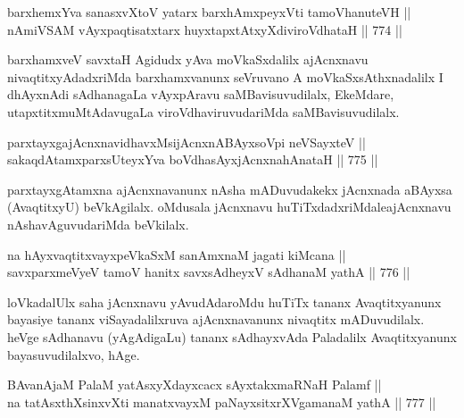 
\begin{shl}
barxhemxYva sanasxvXtoV yatarx barxhAmxpeyxVti tamoVhanuteVH || \\
nAmiVSAM vAyxpaqtisatxtarx huyxtapxtAtxyXdiviroVdhataH \hfill || 774 ||  
\end{shl}

\begin{artha} 
barxhamxveV savxtaH Agidudx yAva moVkaSxdalilx ajAcnxnavu nivaqtitxyAdadxriMda barxhamxvanunx seVruvano A moVkaSxsAthxnadalilx I dhAyxnAdi sAdhanagaLa vAyxpAravu saMBavisuvudilalx, EkeMdare, utapxtitx\break muMtAdavugaLa viroVdhaviruvudariMda saMBavisuvudilalx.
\end{artha}


\begin{shl}
parxtayxgajAcnxnavidhavxMsijAcnxnABAyxsoV\s pi neVSayxteV || \\
sakaqdAtamxparxsUteyxYva boVdhasAyxjAcnxnahAnataH \hfill || 775 ||  
\end{shl}

\begin{artha} 
parxtayxgAtamxna ajAcnxnavanunx nAsha mADuvudakekx jAcnxnada aBAyxsa (AvaqtitxyU) beVkAgilalx. oMdusala jAcnxnavu huTiTxdadxriMdale\break ajAcnxnavu nAshavAguvudariMda beVkilalx.
\end{artha}

\begin{shl}
na hAyxvaqtitxvayxpeVkaSxM sanAmxnaM jagati kiMcana || \\
savxparxmeVyeV tamoV hanitx savxsAdheyxV sAdhanaM yathA \hfill || 776 ||  
\end{shl}

\begin{artha} 
loVkadalUlx saha jAcnxnavu yAvudAdaroMdu huTiTx tananx Avaqtitxyanunx bayasiye tananx viSayadalilxruva ajAcnxnavanunx nivaqtitx mADuvudilalx. heVge sAdhanavu (yAgAdigaLu) tananx sAdhayxvAda Paladalilx Avaqtitxyanunx bayasuvudilalxvo, hAge.
\end{artha}


\begin{shl}
BAvanAjaM PalaM yatAsxyXdayxcacx sAyxtakxmaRNaH Palamf || \\
na tatAsxthXsinxvXti manatxvayxM paNayxsitxrXVgamanaM yathA \hfill || 777 ||  
\end{shl}

